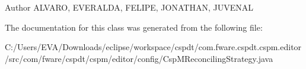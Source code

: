 \begin{DoxyAuthor}{Author}
A\+L\+V\+A\+RO, E\+V\+E\+R\+A\+L\+DA, F\+E\+L\+I\+PE, J\+O\+N\+A\+T\+H\+AN, J\+U\+V\+E\+N\+AL 
\end{DoxyAuthor}


The documentation for this class was generated from the following file\+:\begin{DoxyCompactItemize}
\item 
C\+:/\+Users/\+E\+V\+A/\+Downloads/eclipse/workspace/cspdt/com.\+fware.\+cspdt.\+cspm.\+editor/src/com/fware/cspdt/cspm/editor/config/Csp\+M\+Reconciling\+Strategy.\+java\end{DoxyCompactItemize}
